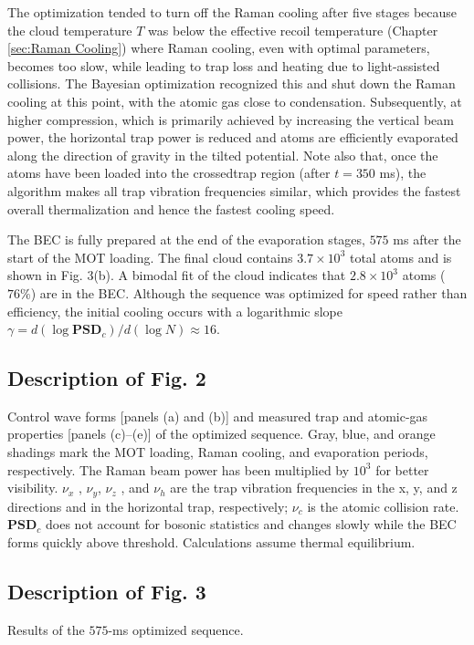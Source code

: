 \documentclass{article}
\begin{document}
The optimization tended to turn off the Raman cooling after five stages because the cloud temperature $T$ was below the effective recoil temperature (Chapter \ref{sec:Raman Cooling}) where Raman cooling, even with optimal parameters, becomes too slow, while leading to trap loss and heating due to light-assisted collisions. The Bayesian optimization recognized this and shut down the Raman cooling at this point, with the atomic gas close to condensation. Subsequently, at higher compression, which is primarily achieved by increasing the vertical beam power, the horizontal trap power is reduced and atoms are efficiently evaporated along the direction of gravity in the tilted potential. Note also that, once the atoms have been loaded into the crossedtrap region (after $t = 350$ ms), the algorithm makes all trap vibration frequencies similar, which provides the fastest overall thermalization and hence the fastest cooling speed.

The BEC is fully prepared at the end of the evaporation stages, $575$ ms after the start of the MOT loading. The final cloud contains $3.7 \times 10^3$ total atoms and is shown in Fig. 3(b). A bimodal fit of the cloud indicates that $2.8 \times 10^3$ atoms ($76\%$) are in the BEC. Although the sequence was optimized for speed rather than efficiency, the initial cooling occurs with a logarithmic slope $\gamma = d(\log \mathbf{PSD}_c )/d(\log N) \approx 16$.

\subsection{Description of Fig. 2}
Control wave forms [panels (a) and (b)] and measured trap and atomic-gas properties [panels (c)–(e)] of the optimized sequence. Gray, blue, and orange shadings mark the MOT loading, Raman cooling, and evaporation periods, respectively. The Raman beam power has been multiplied by $10^3$ for better visibility. $\nu_x$ , $\nu_y$, $\nu_z$ , and $\nu_h$ are the trap vibration frequencies in the x, y, and z directions and in the horizontal trap, respectively; $\nu_c$ is the atomic collision rate. $\mathbf{PSD}_c$ does not account for bosonic statistics and changes slowly while the BEC forms quickly above threshold. Calculations assume thermal equilibrium.

\subsection{Description of Fig. 3}
Results of the $575$-ms optimized sequence. 
\end{document}
